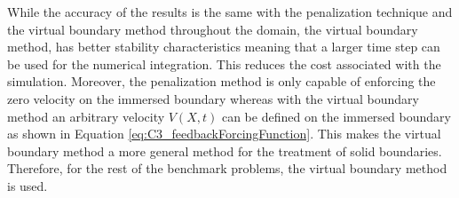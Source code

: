 While the accuracy of the results is the same with the penalization technique and the virtual boundary method throughout the domain, the virtual boundary method, has better stability characteristics meaning that a larger time step can be used for the numerical integration. This reduces the cost associated with the simulation. Moreover, the penalization method is only capable of enforcing the zero velocity on the immersed boundary whereas with the virtual boundary method an arbitrary velocity $V(X, t)$ can be defined on the immersed boundary as shown in Equation \eqref{eq:C3_feedbackForcingFunction}. This makes the virtual boundary method a more general method for the treatment of solid boundaries. Therefore, for the rest of the benchmark problems, the virtual boundary method is used.